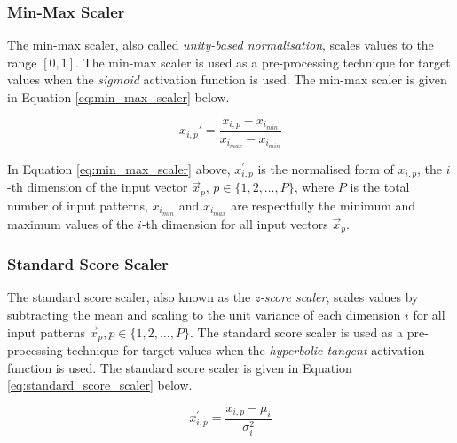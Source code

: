 \subsubsection{Min-Max Scaler}\label{sec:anns:an:input:min_max_scaler}

The min-max scaler, also called \textit{unity-based normalisation}, scales values to the range $[0,1]$. The min-max scaler is used as a pre-processing technique for target values when the \textit{sigmoid}  activation function is used. The min-max scaler is given in Equation \eqref{eq:min_max_scaler} below.

\begin{equation}
    x_{i,p}'  = \frac{x_{i,p} - x_{i_{min}}}{x_{i_{max}} - x_{i_{min}}}
    \label{eq:min_max_scaler}
\end{equation}

\noindent
In Equation \eqref{eq:min_max_scaler} above, $x_{i,p}^{'}$ is the normalised form of $x_{i,p}$, the $i$-th dimension of the input vector $\vec{x}_p$, $p \in \{1,2, \dots, P \}$, where $P$ is the total number of input patterns, $x_{i_{min}}$ and $x_{i_{max}}$ are respectfully the minimum and maximum values of the $i$-th dimension for all input vectors $\vec{x}_p$.

\subsubsection{Standard Score Scaler}\label{sec:anns:an:input:standard_score_scaler}

The standard score scaler, also known as the \textit{z-score scaler}, scales values by subtracting the mean and scaling to the unit variance of each dimension $i$ for all input patterns $\vec{x}_p, p \in \{1,2, \dots, P\}$. The standard score scaler is used as a pre-processing technique for target values when the \textit{hyperbolic tangent} activation function is used. The standard score scaler is given in Equation \eqref{eq:standard_score_scaler} below.

\begin{equation}
    x_{i,p}^{'} = \frac{x_{i,p} - \mu_i}{\sigma^2_i}
    \label{eq:standard_score_scaler}
\end{equation}

